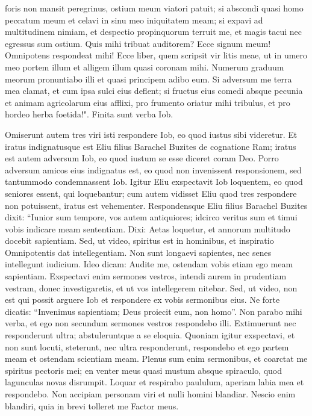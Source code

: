 \begin{biblechapter}
\verse foris non mansit peregrinus, ostium meum viatori patuit; 
\verse si abscondi quasi homo peccatum meum et celavi in sinu meo iniquitatem meam; 
\verse si expavi ad multitudinem nimiam, et despectio propinquorum terruit me, et magis tacui nec egressus sum ostium. 
\verse Quis mihi tribuat auditorem? Ecce signum meum! Omnipotens respondeat mihi! Ecce liber, quem scripsit vir litis meae, 
\verse ut in umero meo portem illum et alligem illum quasi coronam mihi. 
\verse Numerum graduum meorum pronuntiabo illi et quasi principem adibo eum. 
\verse Si adversum me terra mea clamat, et cum ipsa sulci eius deflent; 
\verse si fructus eius comedi absque pecunia et animam agricolarum eius afflixi, 
\verse pro frumento oriatur mihi tribulus, et pro hordeo herba foetida!". Finita sunt verba Iob. 
\end{biblechapter}

\begin{biblechapter}  
\verse Omiserunt autem tres viri isti respondere Iob, eo quod iustus sibi videretur. 
\verse Et iratus indignatusque est Eliu filius Barachel Buzites de cognatione Ram; iratus est autem adversum Iob, eo quod iustum se esse diceret coram Deo. 
\verse Porro adversum amicos eius indignatus est, eo quod non invenissent responsionem, sed tantummodo condemnassent Iob. 
\verse Igitur Eliu exspectavit Iob loquentem, eo quod seniores essent, qui loquebantur; 
\verse cum autem vidisset Eliu quod tres respondere non potuissent, iratus est vehementer.  
\verse Respondensque Eliu filius Barachel Buzites dixit: “Iunior sum tempore, vos autem antiquiores; idcirco veritus sum et timui vobis indicare meam sententiam. 
\verse Dixi: Aetas loquetur, et annorum multitudo docebit sapientiam. 
\verse Sed, ut video, spiritus est in hominibus, et inspiratio Omnipotentis dat intellegentiam. 
\verse Non sunt longaevi sapientes, nec senes intellegunt iudicium. 
\verse Ideo dicam: Audite me, ostendam vobis etiam ego meam sapientiam. 
\verse Exspectavi enim sermones vestros, intendi aurem in prudentiam vestram, donec investigaretis, 
\verse et ut vos intellegerem nitebar. Sed, ut video, non est qui possit arguere Iob et respondere ex vobis sermonibus eius. 
\verse Ne forte dicatis: “Invenimus sapientiam; Deus proiecit eum, non homo”. 
\verse Non parabo mihi verba, et ego non secundum sermones vestros respondebo illi. 
\verse Extimuerunt nec responderunt ultra; abstuleruntque a se eloquia. 
\verse Quoniam igitur exspectavi, et non sunt locuti, steterunt, nec ultra responderunt, 
\verse respondebo et ego partem meam et ostendam scientiam meam. 
\verse Plenus sum enim sermonibus, et coarctat me spiritus pectoris mei; 
\verse en venter meus quasi mustum absque spiraculo, quod lagunculas novas disrumpit. 
\verse Loquar et respirabo paululum, aperiam labia mea et respondebo. 
\verse Non accipiam personam viri et nulli homini blandiar. 
\verse Nescio enim blandiri, quia in brevi tolleret me Factor meus. 
\end{biblechapter}

